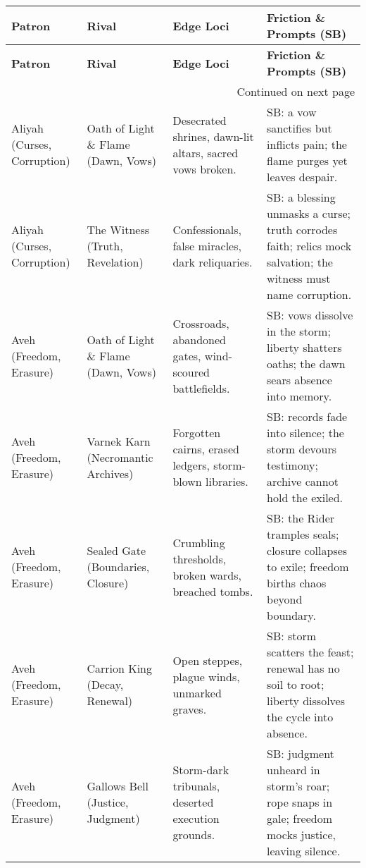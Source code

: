 \begin{longtable}{@{}p{3.3cm}p{3.3cm}p{4.6cm}p{7.2cm}@{}}
  \toprule
  \textbf{Patron} & \textbf{Rival} & \textbf{Edge Loci} & \textbf{Friction \& Prompts (SB)} \\
  \midrule
  \endfirsthead

  \toprule
  \textbf{Patron} & \textbf{Rival} & \textbf{Edge Loci} & \textbf{Friction \& Prompts (SB)} \\
  \midrule
  \endhead

  \midrule
  \multicolumn{4}{r}{{Continued on next page}} \\
  \endfoot

  \bottomrule
  \endlastfoot

  Aliyah (Curses, Corruption) & Oath of Light \& Flame (Dawn, Vows) &
  Desecrated shrines, dawn-lit altars, sacred vows broken. &
  SB: a vow sanctifies but inflicts pain; the flame purges yet leaves despair. \\

  Aliyah (Curses, Corruption) & The Witness (Truth, Revelation) &
  Confessionals, false miracles, dark reliquaries. &
  SB: a blessing unmasks a curse; truth corrodes faith; relics mock salvation; the witness must name corruption. \\

  Aveh (Freedom, Erasure) & Oath of Light \& Flame (Dawn, Vows) &  
  Crossroads, abandoned gates, wind-scoured battlefields. &  
  SB: vows dissolve in the storm; liberty shatters oaths; the dawn sears absence into memory. \\

  Aveh (Freedom, Erasure) & Varnek Karn (Necromantic Archives) &  
  Forgotten cairns, erased ledgers, storm-blown libraries. &  
  SB: records fade into silence; the storm devours testimony; archive cannot hold the exiled. \\

  Aveh (Freedom, Erasure) & Sealed Gate (Boundaries, Closure) &  
  Crumbling thresholds, broken wards, breached tombs. &  
  SB: the Rider tramples seals; closure collapses to exile; freedom births chaos beyond boundary. \\

  Aveh (Freedom, Erasure) & Carrion King (Decay, Renewal) &  
  Open steppes, plague winds, unmarked graves. &  
  SB: storm scatters the feast; renewal has no soil to root; liberty dissolves the cycle into absence. \\

  Aveh (Freedom, Erasure) & Gallows Bell (Justice, Judgment) &  
  Storm-dark tribunals, deserted execution grounds. &  
  SB: judgment unheard in storm’s roar; rope snaps in gale; freedom mocks justice, leaving silence. \\


\end{longtable}

